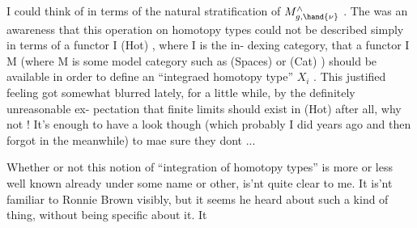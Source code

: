 I could think of in terms of the natural stratification of $M^{\wedge}_{g,\hand{\nu}}$ .  The
was an awareness that this operation on homotopy types could not be
described simply in terms of a functor  I \hand{$\longrightarrow$} (Hot) ,  where I is the in-%
dexing category,  that a functor  I \hand{$\longrightarrow$} M  (where M is some model category
such as (Spaces)  or (Cat) ) should be available in order to define an
``integraed homotopy type''  \hand{$\int$}$X_i$ .  This justified feeling got somewhat
blurred lately,  for a little while,  by the definitely unreasonable ex-%
pectation that finite limits should exist in (Hot) after all,  why not !
It's enough to have a look though (which probably I did years ago and then
forgot in the meanwhile) to mae sure they dont ...

\quad Whether or not this notion of ``integration of homotopy types'' is
more or less well known already under some name or other,  is'nt quite
clear to me.  It is'nt familiar to Ronnie Brown visibly,  but it seems he
heard about such a kind of thing,  without  being specific about it.  It
